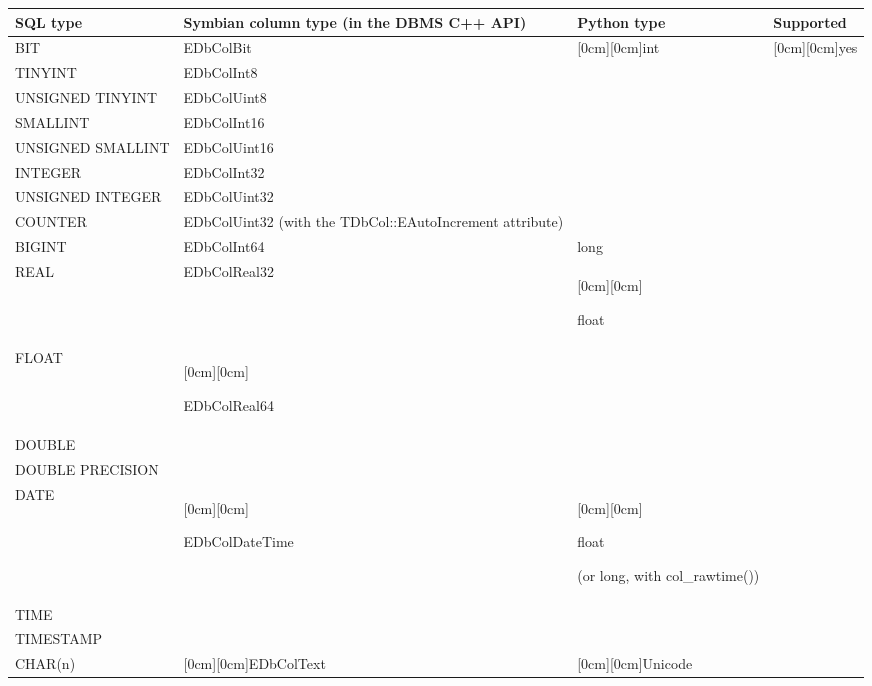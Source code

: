 \begin{table}[htbp]
\begin{center}
\begin{tabular}{|p{117pt}|p{144pt}|p{99pt}|p{63pt}|}
\hline
SQL type& 
Symbian column type (in the DBMS C++ API)& 
Python type& 
Supported \\
\hline
\textsf{BIT}& 
\textsf{EDbColBit}& 
\raisebox{-10.50ex}[0cm][0cm]{int}& 
\raisebox{-27.00ex}[0cm][0cm]{yes} \\
\cline{1-2} 
\textsf{TINYINT}& 
\textsf{EDbColInt8}& 
 & 
  \\
\cline{1-2} 
\textsf{UNSIGNED TINYINT}& 
\textsf{EDbColUint8}& 
 & 
  \\
\cline{1-2} 
\textsf{SMALLINT}& 
\textsf{EDbColInt16}& 
 & 
  \\
\cline{1-2} 
\textsf{UNSIGNED SMALLINT}& 
\textsf{EDbColUint16}& 
 & 
  \\
\cline{1-2} 
\textsf{INTEGER}& 
\textsf{EDbColInt32}& 
 & 
  \\
\cline{1-2} 
\textsf{UNSIGNED INTEGER}& 
\textsf{EDbColUint32}& 
 & 
  \\
\cline{1-2} 
\textsf{COUNTER}& 
\textsf{EDbColUint32 (}with the\textsf{ TDbCol::EAutoIncrement }attribute\textsf{)}& 
 & 
  \\
\cline{1-3} 
\textsf{BIGINT}& 
\textsf{EDbColInt64}& 
long& 
  \\
\cline{1-3} 
\textsf{REAL}& 
\textsf{EDbColReal32}& 
\raisebox{-4.50ex}[0cm][0cm]{float  \par }& 
  \\
\cline{1-2} 
\textsf{FLOAT}& 
\raisebox{-3.00ex}[0cm][0cm]{\textsf{EDbColReal64} \par \textsf{}}& 
 & 
  \\
\cline{1-1} 
\textsf{DOUBLE}& 
 & 
 & 
  \\
\cline{1-1} 
\textsf{DOUBLE PRECISION}& 
 & 
 & 
  \\
\cline{1-3} 
\textsf{DATE}& 
\raisebox{-3.00ex}[0cm][0cm]{\textsf{EDbColDateTime} \par \textsf{}}& 
\raisebox{-3.00ex}[0cm][0cm]{float \par (or long, with \textsf{col_rawtime()})}& 
  \\
\cline{1-1} 
\textsf{TIME}& 
 & 
 & 
  \\
\cline{1-1} 
\textsf{TIMESTAMP}& 
 & 
 & 
  \\
\cline{1-3} 
\textsf{CHAR(n)}& 
\raisebox{-1.50ex}[0cm][0cm]{\textsf{EDbColText}}& 
\raisebox{-3.00ex}[0cm][0cm]{Unicode}& 
  \\

\end{tabular}
\end{center}
\end{table}
